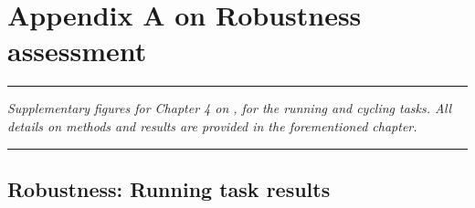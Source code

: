 
\appendix
\renewcommand\chaptername{Appendix~}

\lhead[\fancyplain{}{\leftmark}]%
      {\fancyplain{}{}} %
\chead[\fancyplain{}{}]%
      {\fancyplain{}{}}
\rhead[\fancyplain{}{}]%
      {\fancyplain{}{\rightmark}}%
\lfoot[\fancyplain{}{}]%
      {\fancyplain{}{}}
\cfoot[\fancyplain{}{\thepage}]%
      {\fancyplain{}{\thepage}} %
\rfoot[\fancyplain{}{}]%
     {\fancyplain{}{\scriptsize}}



\chapter{Appendix A on Robustness assessment}
\label{Ann:1}


\begin{center}
\rule{0.7\linewidth}{.5pt}
\begin{minipage}{0.7\linewidth}
\smallskip

\textit{
Supplementary figures for Chapter 4 on , for the running and cycling tasks. \newline\newline All details on methods and results are provided in the forementioned chapter.
}

\end{minipage}
\smallskip
\rule{0.7\linewidth}{.5pt}
\end{center}

\minitoc
\newpage

\section{Robustness: Running task results}

